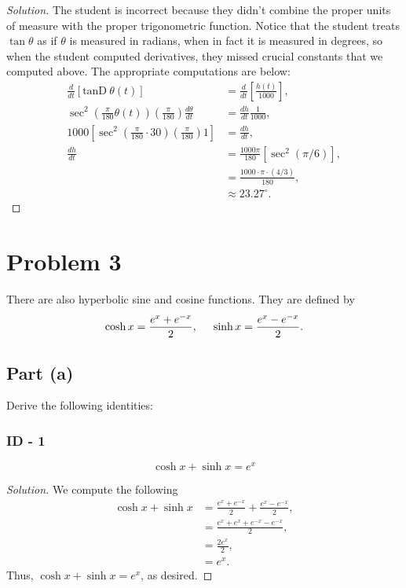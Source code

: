 \documentclass[letterpaper, 12pt]{amsart}
\theoremstyle{definition}  %
\begin{document}
		\begin{proof}[Solution]
		The student is incorrect because they didn't combine the proper units of measure with the proper trigonometric function.
		Notice that the student treats $\tan \theta$ as if $\theta$ is measured in radians, when in fact it is measured in degrees, so when the student computed derivatives, they missed crucial constants that we computed above.
		The appropriate computations are below:
			\begin{align*}
				\frac{d}{dt} \left[ \text{tanD} \ \theta(t) \right] &= \frac{d}{dt} \left[ \frac{h(t)}{1000} \right], \\
				\sec^{2}\left( \frac{\pi}{180}\theta(t) \right) \left( \frac{\pi}{180} \right) \frac{d \theta}{dt} &= \frac{dh}{dt} \frac{1}{1000}, \\
				1000 \left[ \sec^{2}\left( \frac{\pi}{180} \cdot 30 \right) \left( \frac{\pi}{180} \right) 1 \right] &= \frac{dh}{dt}, \\
				\frac{dh}{dt} &= \frac{1000 \pi}{180} \left[ \sec^{2}\left( \pi/6 \right) \right], \\
				&= \frac{1000 \cdot \pi \cdot (4/3)}{180}, \\
				&\approx 23.27^{\circ}.
			\end{align*}
			
		\end{proof}

	\section*{Problem 3}
	There are also hyperbolic sine and cosine functions. 
	They are defined by $$\cosh x = \frac{e^{x} + e^{-x}}{2}, \hspace{5mm} \sinh x = \frac{e^{x} - e^{-x}}{2}.$$

		\subsection*{Part (a)}
		Derive the following identities:
			\subsubsection*{ID - 1}
			\[ \cosh x + \sinh x = e^{x} \]

			\begin{proof}[Solution]
			We compute the following
				\begin{align*}
					\cosh x + \sinh x &= \frac{e^{x} + e^{-x}}{2} + \frac{e^{x} - e^{-x}}{2}, \\
					&= \frac{e^{x} + e^{x} + e^{-x} - e^{-x}}{2}, \\
					&= \frac{2e^{x}}{2}, \\
					&= e^{x}.
				\end{align*}
			Thus, $\cosh x + \sinh x = e^{x}$, as desired.
			\end{proof}
			\pagebreak
\end{document}
